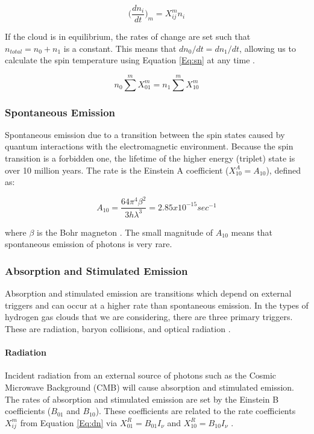 \begin{equation} \label{Eq:dn}
\Big( \frac{d n_i}{dt} \Big)_m = X^m_{ij} n_i
\end{equation}

If the cloud is in equilibrium, the rates of change are set such that $n_{total} = n_0 + n_1$ is a constant. This means that $d n_0/dt = d n_1 /dt$, allowing us to calculate the spin temperature using Equation \ref{Eq:sn} at any time \cite{field_1958}. 

\begin{equation} \label{Eq:sn}
n_0 \sum^m X^m_{01} = n_1 \sum^m X^m_{10}
\end{equation}

\subsubsection{Spontaneous Emission}

Spontaneous emission due to a transition between the spin states caused by quantum interactions with the electromagnetic environment. Because the spin transition is a forbidden one, the lifetime of the higher energy (triplet) state is over 10 million years. The rate is the Einstein A coefficient ($X^A_{10} = A_{10}$), defined as:

\begin{equation}
A_{10} = \frac{64 \pi^4 \beta^2}{3 h \lambda^3} = 2.85 x 10^{-15} sec^{-1}
\end{equation}

where $\beta$ is the Bohr magneton \cite{field_1958}. The small magnitude of $A_{10}$ means that spontaneous emission of \cm photons is very rare. 

\subsubsection{Absorption and Stimulated Emission}

Absorption and stimulated emission are transitions which depend on external triggers and can occur at a higher rate than spontaneous emission. In the types of hydrogen gas clouds that we are considering, there are three primary triggers. These are \cm radiation, baryon collisions, and optical radiation \cite{field_1958}. 

\paragraph{\cm Radiation}

Incident radiation from an external source of \cm photons such as the Cosmic Microwave Background (CMB) will cause absorption and stimulated emission. The rates of absorption and stimulated emission are set by the Einstein B coefficients ($B_{01}$ and $B_{10}$). These coefficients are related to the rate coefficients $X^{m}_{ij}$ from Equation \ref{Eq:dn} via  $X^R_{01} = B_{01} I_\nu$ and $X^R_{10} = B_{10} I_{\nu}$ \cite{field_1958}. 

